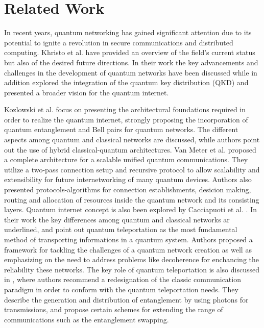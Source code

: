 \documentclass[12pt,a4paper] {report}
\begin{document}
\chapter{Related Work}
		In recent years, quantum networking has gained
		significant attention due to its potential to ignite a revolution in
		secure communications and distributed computing.
		Khristo et al. \cite{Khristo2020} have provided an overview of the field's
		current status but also of the desired future directions.
		In their work the key advancements and challenges in the
		development of quantum networks have been discussed while in addition
		explored the integration of the quantum key distribution (QKD)
		and presented a broader vision for the quantum internet.
		
		Kozlowski et al. \cite{rfc} focus on presenting the architectural foundations required in order to
		realize the quantum internet, strongly proposing the incorporation of quantum entanglement and Bell pairs for quantum networks. 
		The different aspects among quantum and classical networks are discussed, while authors point out the use of hybrid
		classical-quantum architectures. Van Meter et al. \cite{quantum-arch} proposed a complete architecture 
		for a scalable unified quantum communications. They utilize a two-pass connection setup and recursive protocol
		to allow scalability and extensibility for future internetworking
		of many quantum devices. Authors also presented protocols-algorithms for connection establishments, desicion making, routing and 
		allocation of resources inside the quantum network and its consisting layers.
		Quantum internet concept is also been explored by Cacciapuoti et al. \cite{net-chall-dqc}.
		In their work the key differences among quantum and classical
		networks ar underlined, and point out quantum teleportation as the most fundamental method of transporting 
		informations in a quantum system. Authors proposed a framework for tackling the challenges of a quantum
		network creation as well as emphasizing on the need to address problems like decoherence for enchancing the
		reliability these networks. The key role of quantum teleportation is also discussed in \cite{entagl-classic},
		where authors recommend a redesignation of the classic communication paradigm in order to conform with the quantum teleportation needs.
		They describe the generation and distribution of entanglement by using photons for transmissions, and propose certain schemes for extending
		the range of communications such as the entanglement swapping.
\end{document}
